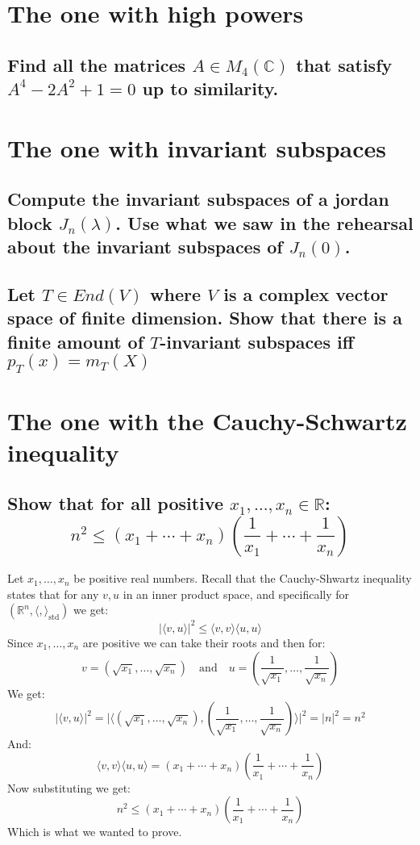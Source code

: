 \documentclass[11pt,a4paper]{article}
\theoremstyle{plain}
\DeclareMathOperator{\std}{std}
\newcommand{\R}{\mathbb{R}}
\newcommand{\C}{\mathbb{C}}
\begin{document}
	\newpage

	\section{The one with high powers}
	\subsection{Find all the matrices $A\in M_4(\C)$ that satisfy $A^4-2A^2+1=0$
	up to similarity.}

	\newpage

	\section{The one with invariant subspaces}
	\subsection{Compute the invariant subspaces of a jordan block $J_n(\lambda)$.
	Use what we saw in the rehearsal about the invariant subspaces of $J_n(0)$.}

	\newpage

	\subsection{Let $T\in End(V)$ where $V$ is a complex vector space of finite
	dimension. Show that there is a finite amount of $T$-invariant subspaces iff
	$p_T(x) = m_T(X)$}

\newpage
	\section{The one with the Cauchy-Schwartz inequality}
	
	\subsection{Show that for all positive $x_1,\dots,x_n\in\R$:
	\[
	n^2 \le (x_1+\cdots+x_n)\left(\frac{1}{x_1}+\cdots+\frac{1}{x_n}\right)
	\]}
	Let $x_1,\dots,x_n$ be positive real numbers.
	Recall that the Cauchy-Shwartz inequality states that for any $v,u$ in an 
	inner product space, and specifically for $(\R^n,\langle,\rangle_{\std})$
	we get:
	\[
		\vert\langle v,u\rangle\vert^2 \le \langle v,v\rangle\langle u,u\rangle
	\]
	Since $x_1,\dots,x_n$ are positive we can take their roots and then for:
	\[ 
		v=(\sqrt{x_1},\dots,\sqrt{x_n}) \quad\text{and}\quad 
		u=(\frac{1}{\sqrt{x_1}},\dots,\frac{1}{\sqrt{x_n}})
	\]
	We get:
	\[
		\vert\langle v,u\rangle\vert^2 = 
		\vert\langle (\sqrt{x_1},\dots,\sqrt{x_n}),
		(\frac{1}{\sqrt{x_1}},\dots,\frac{1}{\sqrt{x_n}})\rangle\vert^2 =
		\vert n\vert^2 = n^2
	\]
	And:
	\[
		\langle v,v\rangle\langle u,u\rangle = 
		(x_1+\cdots+x_n)(\frac{1}{x_1}+\cdots+\frac{1}{x_n})
	\]
	Now substituting we get:
	\[
		n^2 \le (x_1+\cdots+x_n)\left(\frac{1}{x_1}+\cdots+\frac{1}{x_n}\right)
	\]
	Which is what we wanted to prove.
\end{document}
